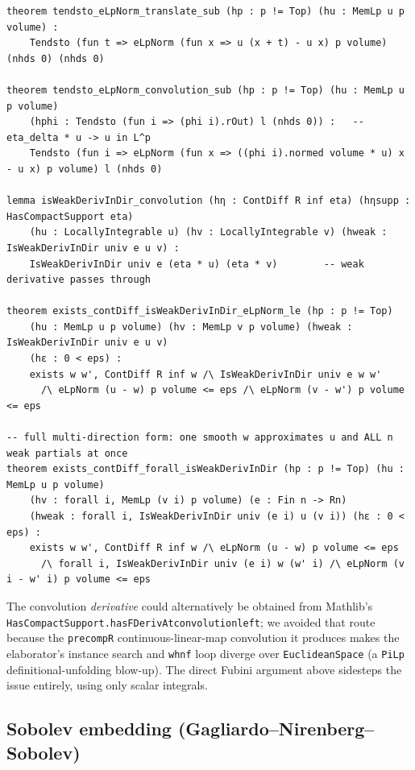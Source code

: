 ﻿\documentclass[12pt, a4paper]{article}
\renewcommand{\_}{\origunderscore\allowbreak}
\theoremstyle{definition}
\theoremstyle{plain}
\begin{document}
\begin{lstlisting}[caption={Mollification and Meyers--Serrin (proved, zero sorry)}]
theorem tendsto_eLpNorm_translate_sub (hp : p != Top) (hu : MemLp u p volume) :
    Tendsto (fun t => eLpNorm (fun x => u (x + t) - u x) p volume) (nhds 0) (nhds 0)

theorem tendsto_eLpNorm_convolution_sub (hp : p != Top) (hu : MemLp u p volume)
    (hphi : Tendsto (fun i => (phi i).rOut) l (nhds 0)) :   -- eta_delta * u -> u in L^p
    Tendsto (fun i => eLpNorm (fun x => ((phi i).normed volume * u) x - u x) p volume) l (nhds 0)

lemma isWeakDerivInDir_convolution (hη : ContDiff R inf eta) (hηsupp : HasCompactSupport eta)
    (hu : LocallyIntegrable u) (hv : LocallyIntegrable v) (hweak : IsWeakDerivInDir univ e u v) :
    IsWeakDerivInDir univ e (eta * u) (eta * v)        -- weak derivative passes through

theorem exists_contDiff_isWeakDerivInDir_eLpNorm_le (hp : p != Top)
    (hu : MemLp u p volume) (hv : MemLp v p volume) (hweak : IsWeakDerivInDir univ e u v)
    (hε : 0 < eps) :
    exists w w', ContDiff R inf w /\ IsWeakDerivInDir univ e w w'
      /\ eLpNorm (u - w) p volume <= eps /\ eLpNorm (v - w') p volume <= eps

-- full multi-direction form: one smooth w approximates u and ALL n weak partials at once
theorem exists_contDiff_forall_isWeakDerivInDir (hp : p != Top) (hu : MemLp u p volume)
    (hv : forall i, MemLp (v i) p volume) (e : Fin n -> Rn)
    (hweak : forall i, IsWeakDerivInDir univ (e i) u (v i)) (hε : 0 < eps) :
    exists w w', ContDiff R inf w /\ eLpNorm (u - w) p volume <= eps
      /\ forall i, IsWeakDerivInDir univ (e i) w (w' i) /\ eLpNorm (v i - w' i) p volume <= eps
\end{lstlisting}

The convolution \emph{derivative} could alternatively be obtained from Mathlib's
\texttt{HasCompactSupport.hasFDerivAt\_convolution\_left}; we avoided that route because the
\texttt{precompR} continuous-linear-map convolution it produces makes the elaborator's
instance search and \texttt{whnf} loop diverge over \texttt{EuclideanSpace} (a \texttt{PiLp}
definitional-unfolding blow-up).  The direct Fubini argument above sidesteps the issue entirely,
using only scalar integrals.

\subsection{Sobolev embedding (Gagliardo--Nirenberg--Sobolev)}
\end{document}
